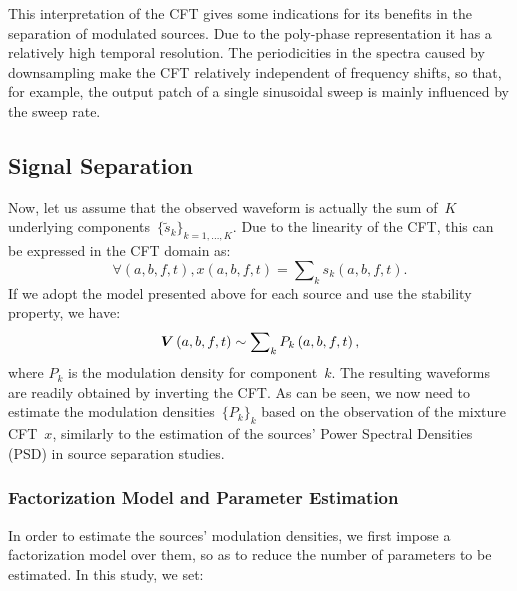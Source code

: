 This interpretation of the CFT gives some indications for its benefits in the
separation of modulated sources. Due to the poly-phase representation it has a
relatively high temporal resolution. The periodicities in the spectra caused
by downsampling make the CFT relatively independent of frequency shifts, so
that, for example, the output patch of a single sinusoidal sweep is mainly
influenced by the sweep rate.


\subsection{Signal Separation}
Now, let us assume that the observed waveform is actually the sum
of~$K$ underlying components~$\{ \tilde{s}_{k}\} _{k=1,\dots,K}$.
Due to the linearity of the CFT, this can be
expressed in the CFT domain as:
$$
\forall\left(a,b,f,t\right),x\left(a,b,f,t\right)=\sum\nolimits_{k}s_{k}\left(a,b,f,t\right).
$$
If we adopt the model presented above for each source
and use the stability property, we have:
$$
{\bm{V}}\left(a,b,f,t\right)\sim \sum\nolimits_{k}P_{k}\left(a,b,f,t\right),
$$
where $P_{k}$ is the modulation density for component~$k$.
The resulting waveforms are readily obtained by inverting the CFT.\@
As can be seen, we now need to estimate the modulation
densities~$\{ P_{k}\}_{k}$ based on the observation
of the mixture CFT~$x$, similarly to the estimation of
 the sources' Power Spectral Densities (PSD)
in source separation studies.

\subsubsection{Factorization Model and Parameter Estimation}
\label{sub:NTF}

In order to estimate the sources' modulation densities, we first impose
a factorization model over them, so as to reduce the number of parameters
to be estimated. In this study, we set:

